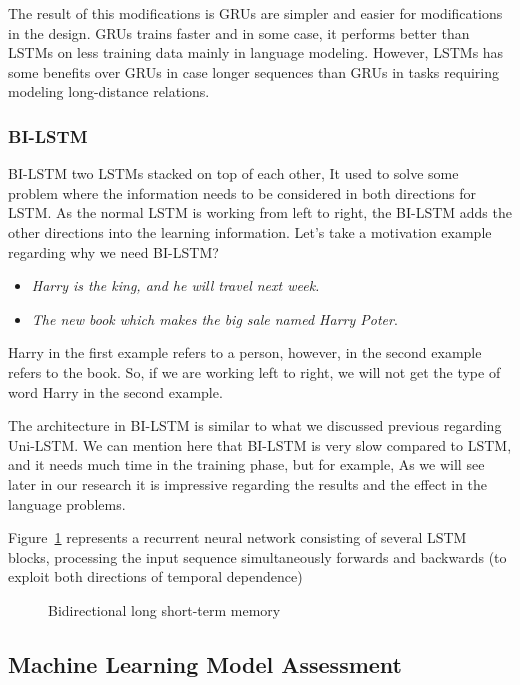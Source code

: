 The result of this modifications is GRUs are simpler and easier for modifications in the design. GRUs trains faster and in some case, it performs better than LSTMs on less training data mainly in language modeling. However, LSTMs has some benefits over GRUs in case longer sequences than GRUs in tasks requiring modeling long-distance relations. 


 
\subsubsection{BI-LSTM}\label{Sec:Bi_Lstm}

BI-LSTM two LSTMs stacked on top of each other, It used to solve some problem where the information needs to be considered in both directions for LSTM. As the normal LSTM is working from left to right, the BI-LSTM adds the other directions into the learning information. Let's take a motivation example regarding why we need BI-LSTM?
\begin{itemize}
\item \textit{Harry is the king, and he will travel next week.}
\item \textit{The new book which makes the big sale named Harry Poter}.
\end{itemize}
Harry in the first example refers to a person, however, in the second example refers to the book. So, if we are working left to right, we will not get the type of word Harry in the second example.

The architecture in BI-LSTM is similar to what we discussed previous regarding Uni-LSTM. We can mention here that BI-LSTM is very slow compared to LSTM, and it needs much time in the training phase, but for example, As we will see later in our research it is impressive regarding the results and the effect in the language problems.

Figure~\ref{Fig:BI-LSTM} represents a recurrent neural network consisting of several LSTM blocks, processing the input sequence simultaneously forwards and backwards (to exploit both directions of temporal dependence)
\begin{figure}[!t]
\centering

\caption{Bidirectional long short-term memory~\cite{Gitrepo_NN_Tikz}}\label{Fig:BI-LSTM}
\end{figure}%

\subsection{Machine Learning Model Assessment}

